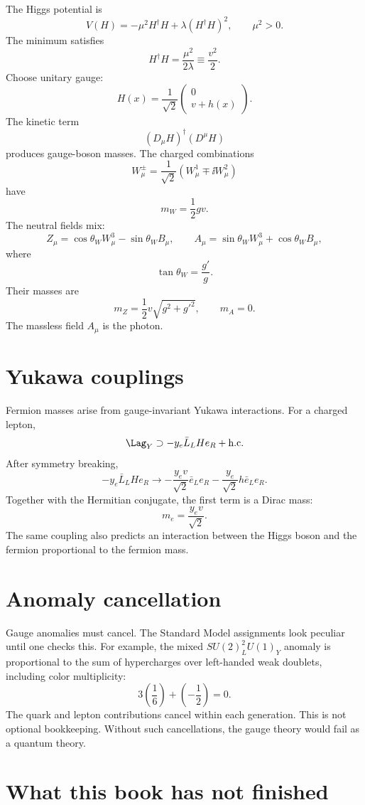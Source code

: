 The Higgs potential is
\[
  V(H)=-\mu^2H^\dagger H+\lambda(H^\dagger H)^2,
  \qquad \mu^2>0.
\]
The minimum satisfies
\[
  H^\dagger H=\frac{\mu^2}{2\lambda}\equiv\frac{v^2}{2}.
\]
Choose unitary gauge:
\[
  H(x)=\frac1{\sqrt2}
  \begin{pmatrix}0\\ v+h(x)\end{pmatrix}.
\]
The kinetic term
\[
  (D_\mu H)^\dagger(D^\mu H)
\]
produces gauge-boson masses.  The charged combinations
\[
  W_\mu^\pm=\frac1{\sqrt2}(W_\mu^1\mp\ii W_\mu^2)
\]
have
\[
  m_W=\frac12gv.
\]
The neutral fields mix:
\[
  Z_\mu=\cos\theta_W W_\mu^3-\sin\theta_W B_\mu,
  \qquad
  A_\mu=\sin\theta_W W_\mu^3+\cos\theta_W B_\mu,
\]
where
\[
  \tan\theta_W=\frac{g'}{g}.
\]
Their masses are
\[
  m_Z=\frac12v\sqrt{g^2+g'^2},
  \qquad
  m_A=0.
\]
The massless field \(A_\mu\) is the photon.

\section{Yukawa couplings}

Fermion masses arise from gauge-invariant Yukawa interactions.  For a charged lepton,
\[
  \Lag_Y\supset -y_e\bar L_LHe_R+\text{h.c.}
\]
After symmetry breaking,
\[
  -y_e\bar L_LHe_R
  \to
  -\frac{y_ev}{\sqrt2}\bar e_Le_R
  -\frac{y_e}{\sqrt2}h\bar e_Le_R.
\]
Together with the Hermitian conjugate, the first term is a Dirac mass:
\[
  m_e=\frac{y_ev}{\sqrt2}.
\]
The same coupling also predicts an interaction between the Higgs boson and the fermion proportional to the fermion mass.

\section{Anomaly cancellation}

Gauge anomalies must cancel.  The Standard Model assignments look peculiar until one checks this.  For example, the mixed \(SU(2)_L^2U(1)_Y\) anomaly is proportional to the sum of hypercharges over left-handed weak doublets, including color multiplicity:
\[
  3\left(\frac16\right)+\left(-\frac12\right)=0.
\]
The quark and lepton contributions cancel within each generation.  This is not optional bookkeeping.  Without such cancellations, the gauge theory would fail as a quantum theory.

\section{What this book has not finished}

